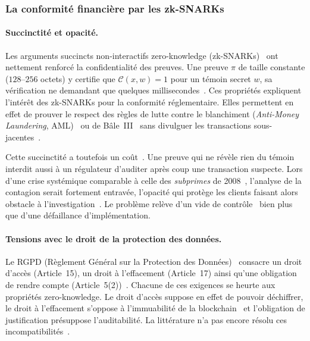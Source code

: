 \subsubsection{La conformit\'e financi\`ere par les zk-SNARKs}
\label{subsubsec:cas_zksnark}
\begin{sloppypar}

\paragraph{Succinctit\'e et opacit\'e.}
\label{par:zksnark_architecture}

Les arguments succincts non-interactifs zero-knowledge (zk-SNARKs)~\cite{Groth16,BCTV14,BenSasson2019}
ont nettement renforc\'e la confidentialit\'e des preuves. Une preuve $\pi$
de taille constante ($128$--$256$ octets) y certifie que
$\mathcal{C}(x, w) = 1$ pour un t\'emoin secret $w$, sa v\'erification ne
demandant que quelques millisecondes~\cite{Parno13,Wahby18}. Ces propri\'et\'es expliquent l'int\'er\^et
des zk-SNARKs pour la conformit\'e r\'eglementaire. Elles permettent en effet de prouver
le respect des r\`egles de lutte contre le blanchiment (\emph{Anti-Money Laundering}, AML)~\cite{FATF12,AMLD4} ou de B\^ale~III~\cite{BaselIII}
sans divulguer les transactions sous-jacentes~\cite{Garratt19}.

Cette succinctit\'e a toutefois un co\^ut~\cite{Bitansky2017}. Une preuve qui ne r\'ev\`ele rien du t\'emoin
interdit aussi \`a un r\'egulateur d'auditer apr\`es coup une transaction suspecte.
Lors d'une crise syst\'emique comparable \`a celle des \textit{subprimes} de 2008~\cite{FCIC2011}, l'analyse de la contagion serait fortement entrav\'ee, l'opacit\'e
qui prot\`ege les clients faisant alors obstacle \`a l'investigation~\cite{Androulaki13,Meiklejohn13}. Le probl\`eme rel\`eve d'un vide de
contr\^ole~\cite{FinckMoscon19,DeFilippi16} bien plus que d'une d\'efaillance d'impl\'ementation.

\paragraph{Tensions avec le droit de la protection des donn\'ees.}
\label{par:zksnark_rgpd}

Le RGPD (R\`eglement G\'en\'eral sur la Protection des Donn\'ees)~\cite{GDPR2016} consacre un droit d'acc\`es (Article~15), un droit
\`a l'effacement (Article~17) ainsi qu'une obligation de rendre compte
(Article~5(2))~\cite{CCPA2018}. Chacune de ces exigences se heurte aux
propri\'et\'es zero-knowledge. Le droit d'acc\`es suppose en effet de pouvoir
d\'echiffrer, le droit \`a l'effacement s'oppose \`a l'immuabilit\'e de la
blockchain~\cite{Nakamoto08,Garay15} et l'obligation de justification pr\'esuppose
l'auditabilit\'e. La litt\'erature n'a pas encore r\'esolu ces
incompatibilit\'es~\cite{FinckMoscon19,Sergey18}.


\end{sloppypar}
